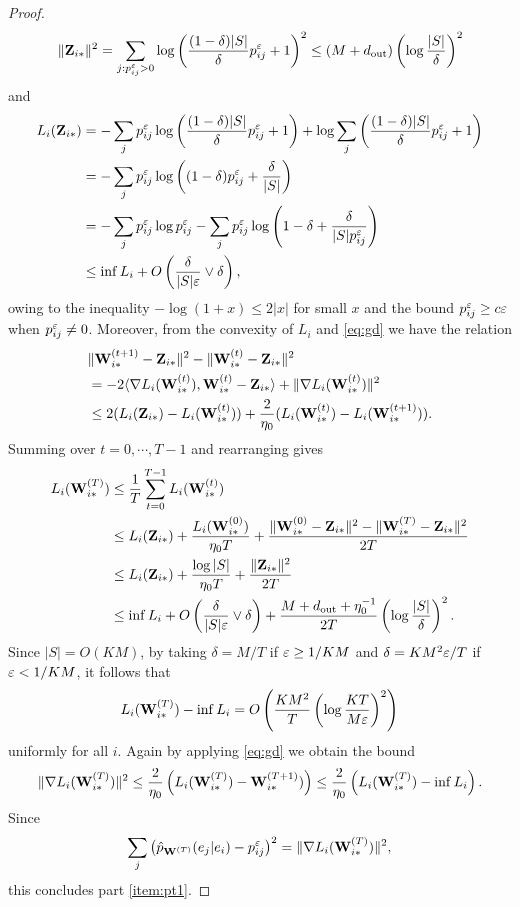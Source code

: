 \begin{proof}
\begin{align*}
\lVert\mathbf{Z}_{i*}\rVert^2 = \sum_{j:p_{ij}^\varepsilon>0} \log\left(\frac{(1-\delta)|S|}{\delta}p_{ij}^\varepsilon +1\right)^2 \le (M+d_{\operatorname{out}}) \left(\log\frac{|S|}{\delta}\right)^2
\end{align*}
and
\begin{align*}
L_i(\mathbf{Z}_{i*}) &= -\sum_j p_{ij}^\varepsilon \log\left(\frac{(1-\delta)|S|}{\delta}p_{ij}^\varepsilon +1\right) + \log\sum_j \left(\frac{(1-\delta)|S|}{\delta}p_{ij}^\varepsilon +1\right)\\
&= - \sum_j p_{ij}^\varepsilon \log\left((1-\delta)p_{ij}^\varepsilon +\frac{\delta}{|S|}\right) \\
&= - \sum_j p_{ij}^\varepsilon\log p_{ij}^\varepsilon -  \sum_j p_{ij}^\varepsilon \log\left(1-\delta +\frac{\delta}{|S|p_{ij}^\varepsilon}\right) \\
&\le \inf L_i + O\left(\frac{\delta}{|S|\varepsilon} \vee \delta\right),
\end{align*}
owing to the inequality $-\log(1+x)\le 2|x|$ for small $x$ and the bound $p_{ij}^\varepsilon \ge c\varepsilon$ when $p_{ij}^\varepsilon\neq 0$. Moreover, from the convexity of $L_i$ and \eqref{eq:gd} we have the relation
\begin{align*}
&\lVert\mathbf{W}_{i*}^{(t+1)}-\mathbf{Z}_{i*}\rVert^2 - \lVert\mathbf{W}_{i*}^{(t)}-\mathbf{Z}_{i*}\rVert^2\\
&= -2\langle \nabla L_i(\mathbf{W}_{i*}^{(t)}), \mathbf{W}_{i*}^{(t)}-\mathbf{Z}_{i*}\rangle + \lVert\nabla L_i(\mathbf{W}_{i*}^{(t)})\rVert^2 \\
&\le 2(L_i(\mathbf{Z}_{i*})-L_i(\mathbf{W}_{i*}^{(t)})) + \frac{2}{\eta_0}(L_i(\mathbf{W}_{i*}^{(t)}) - L_i(\mathbf{W}_{i*}^{(t+1)})).
\end{align*}
Summing over $t=0,\cdots, T-1$ and rearranging gives
\begin{align*}
L_i(\mathbf{W}_{i*}^{(T)}) &\le\frac{1}{T} \sum_{t=0}^{T-1} L_i(\mathbf{W}_{i*}^{(t)})\\
&\le L_i(\mathbf{Z}_{i*}) +\frac{L_i(\mathbf{W}_{i*}^{(0)})}{\eta_0 T} + \frac{\lVert\mathbf{W}_{i*}^{(0)}-\mathbf{Z}_{i*}\rVert^2 - \lVert\mathbf{W}_{i*}^{(T)}-\mathbf{Z}_{i*}\rVert^2}{2T} \\
&\le L_i(\mathbf{Z}_{i*})+\frac{\log|S|}{\eta_0 T} + \frac{\lVert\mathbf{Z}_{i*}\rVert^2}{2T} \\
&\le \inf L_i + O\left(\frac{\delta}{|S|\varepsilon} \vee \delta\right) +\frac{M+d_{\operatorname{out}}+\eta_0^{-1}}{2T} \left(\log\frac{|S|}{\delta}\right)^2.
\end{align*}
Since $|S| = O(KM)$, by taking $\delta = M/T$ if $\varepsilon\ge 1/KM$ and $\delta = KM^2\varepsilon/T$ if $\varepsilon< 1/KM$, it follows that
\begin{equation*}
L_i(\mathbf{W}_{i*}^{(T)})-\inf L_i = O\left(\frac{KM^2}{T}\left(\log \frac{KT}{M\varepsilon}\right)^2 \right)
\end{equation*}
uniformly for all $i$. Again by applying \eqref{eq:gd} we obtain the bound
\begin{align*}
\lVert\nabla L_i(\mathbf{W}_{i*}^{(T)})\rVert^2\le \frac{2}{\eta_0} \left(L_i(\mathbf{W}_{i*}^{(T)}) -\mathbf{W}_{i*}^{(T+1)})\right) \le \frac{2}{\eta_0} \left(L_i(\mathbf{W}_{i*}^{(T)}) -\inf L_i\right).
\end{align*}
Since
\begin{equation*}
\sum_j \left(\hat{p}_{\mathbf{W}^{(T)}}(e_j|e_i) - p_{ij}^\varepsilon \right)^2 =\lVert\nabla L_i(\mathbf{W}_{i*}^{(T)})\rVert^2,
\end{equation*}
this concludes part \ref{item:pt1}.


\end{proof}
